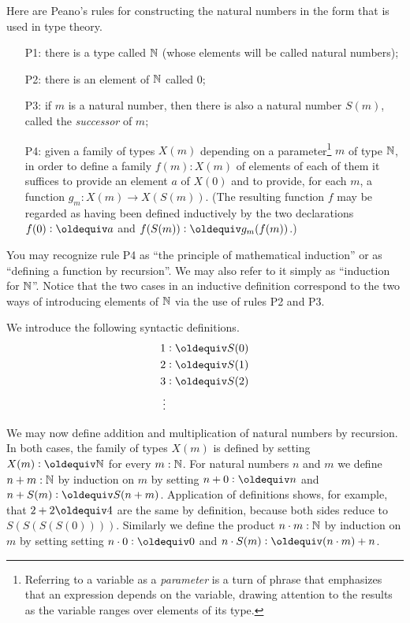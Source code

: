 Here are Peano's rules \citep{peano-principia} for constructing the natural numbers in the form that is used in type theory.
\begin{enumerate}
\item[P1:] there is a type called $\mathbb{N}$ (whose elements will be called natural numbers);
\item[P2:] there is an element of $\mathbb{N}$ called $0$;
\item[P3:] if $m$ is a natural number, then there is also a natural number $S(m)$, called the \emph{successor} of $m$;
\item[P4:] given a family of types $X(m)$ depending on a parameter\footnote{
  Referring to a variable as a {\em parameter} is a turn of phrase that emphasizes that an expression depends on the variable,
  drawing attention to the results as the variable ranges over elements of its type.
  }
  $m$ of type $\mathbb{N}$, in order to define a family $f(m) : X(m)$ of elements of each of them it suffices to provide an element $a$ of $X(0)$ and
  to provide, for each $m$, a function $g_m : X(m) \to X(S(m))$.  (The resulting function $f$ may be regarded as having been defined inductively
  by the two declarations $f(0) \defeq a$ and $f(S(m)) \defeq g_m(f(m))$.)
\end{enumerate}
\nopagebreak
You may recognize rule P4 as ``the principle of mathematical induction'' or as ``defining a function by recursion''.  We may also refer to it
simply as ``induction for $\mathbb{N}$''.  Notice that the two cases in an inductive definition correspond to the two ways of introducing elements of
$\mathbb{N}$ via the use of rules P2 and P3.

We introduce the following syntactic definitions.
\begin{align*}
 1 & \defeq S(0) \\
 2 & \defeq S(1) \\
 3 & \defeq S(2) \\
 \vdots
\end{align*}

We may now define addition and multiplication of natural numbers by recursion.  In both cases, the family of types $X(m)$ is defined by setting
$X(m) \defeq \NN$ for every $m : \mathbb{N}$.  For natural numbers $n$ and $m$ we define $n+m : \mathbb{N}$ by induction on $m$ by setting $n+0\defeq n$ and
$n+S(m)\defeq S(n+m)$.  Application of definitions shows, for example, that $2+2 \jdeq 4$ are the same by definition, because both sides reduce
to $S(S(S(S(0))))$.  Similarly we define the product $n \cdot m : \mathbb{N}$ by induction on $m$ by setting setting $n\cdot 0\defeq 0$ and $n\cdot
S(m)\defeq (n\cdot m) + n$.

